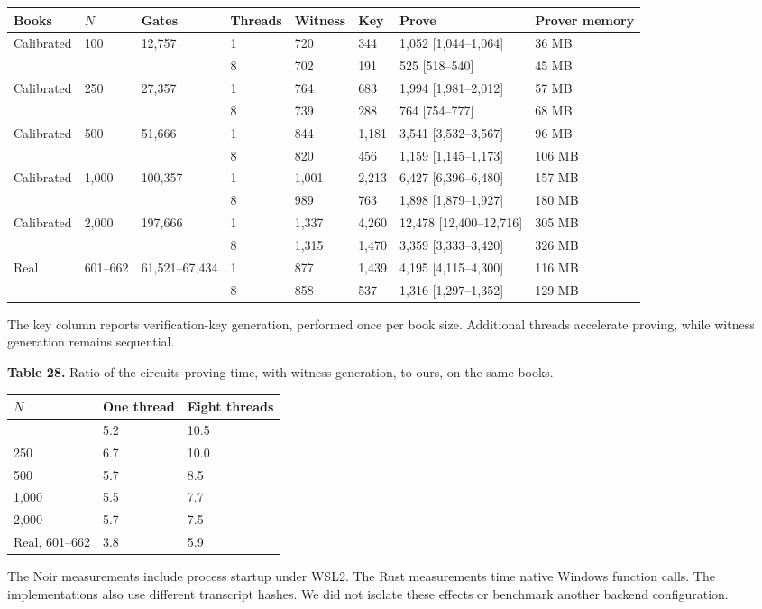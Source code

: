 \begin{longtable}[]{@{}llllllll@{}}
\toprule\noalign{}
Books & \(N\) & Gates & Threads & Witness & Key & Prove & Prover memory \\
\midrule\noalign{}
\endhead
\bottomrule\noalign{}
\endlastfoot
Calibrated & 100 & 12,757 & 1 & 720 & 344 & 1,052 [1,044--1,064] & 36 MB \\
& & & 8 & 702 & 191 & 525 [518--540] & 45 MB \\
Calibrated & 250 & 27,357 & 1 & 764 & 683 & 1,994 [1,981--2,012] & 57 MB \\
& & & 8 & 739 & 288 & 764 [754--777] & 68 MB \\
Calibrated & 500 & 51,666 & 1 & 844 & 1,181 & 3,541 [3,532--3,567] & 96 MB \\
& & & 8 & 820 & 456 & 1,159 [1,145--1,173] & 106 MB \\
Calibrated & 1,000 & 100,357 & 1 & 1,001 & 2,213 & 6,427 [6,396--6,480] & 157 MB \\
& & & 8 & 989 & 763 & 1,898 [1,879--1,927] & 180 MB \\
Calibrated & 2,000 & 197,666 & 1 & 1,337 & 4,260 & 12,478 [12,400--12,716] & 305 MB \\
& & & 8 & 1,315 & 1,470 & 3,359 [3,333--3,420] & 326 MB \\
Real & 601--662 & 61,521--67,434 & 1 & 877 & 1,439 & 4,195 [4,115--4,300] & 116 MB \\
& & & 8 & 858 & 537 & 1,316 [1,297--1,352] & 129 MB \\
\end{longtable}

The key column reports verification-key generation, performed once per book size. Additional threads accelerate proving, while witness generation remains sequential.

\textbf{Table 28.} Ratio of the circuit\textquotesingle s proving time, with witness generation, to ours, on the same books.

\begin{longtable}[]{@{}lll@{}}
\toprule\noalign{}
\(N\) & One thread & Eight threads \\
\midrule\noalign{}
\endhead
\bottomrule\noalign{}
\endlastfoot
100 & 5.2 & 10.5 \\
250 & 6.7 & 10.0 \\
500 & 5.7 & 8.5 \\
1,000 & 5.5 & 7.7 \\
2,000 & 5.7 & 7.5 \\
Real, 601--662 & 3.8 & 5.9 \\
\end{longtable}

The Noir measurements include process startup under WSL2. The Rust measurements time native Windows function calls. The implementations also use different transcript hashes. We did not isolate these effects or benchmark another backend configuration.
